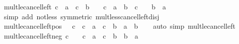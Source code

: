 \begin{isabellebody}
\isanewline
%
\endisadelimproof
\isanewline
{}\isamarkupfalse%
\ mult{\isacharunderscore}{\kern0pt}le{\isacharunderscore}{\kern0pt}cancel{\isacharunderscore}{\kern0pt}left{\isacharcolon}{\kern0pt}\ {\isachardoublequoteopen}c\ {\isacharasterisk}{\kern0pt}\ a\ {\isasymle}\ c\ {\isacharasterisk}{\kern0pt}\ b\ {\isasymlongleftrightarrow}\ {\isacharparenleft}{\kern0pt}{}\ {\isacharless}{\kern0pt}\ c\ {\isasymlongrightarrow}\ a\ {\isasymle}\ b{\isacharparenright}{\kern0pt}\ {\isasymand}\ {\isacharparenleft}{\kern0pt}c\ {\isacharless}{\kern0pt}\ {}\ {\isasymlongrightarrow}\ b\ {\isasymle}\ a{\isacharparenright}{\kern0pt}{\isachardoublequoteclose}\isanewline
%
\isadelimproof
\ \ %
\endisadelimproof
%
\isatagproof
{}\isamarkupfalse%
\ {\isacharparenleft}{\kern0pt}simp\ add{\isacharcolon}{\kern0pt}\ not{\isacharunderscore}{\kern0pt}less\ {\isacharbrackleft}{\kern0pt}symmetric{\isacharbrackright}{\kern0pt}\ mult{\isacharunderscore}{\kern0pt}less{\isacharunderscore}{\kern0pt}cancel{\isacharunderscore}{\kern0pt}left{\isacharunderscore}{\kern0pt}disj{\isacharparenright}{\kern0pt}%
\endisatagproof
{\isafoldproof}%
%
\isadelimproof
\isanewline
%
\endisadelimproof
\isanewline
{}\isamarkupfalse%
\ mult{\isacharunderscore}{\kern0pt}le{\isacharunderscore}{\kern0pt}cancel{\isacharunderscore}{\kern0pt}left{\isacharunderscore}{\kern0pt}pos{\isacharcolon}{\kern0pt}\ {\isachardoublequoteopen}{}\ {\isacharless}{\kern0pt}\ c\ {\isasymLongrightarrow}\ c\ {\isacharasterisk}{\kern0pt}\ a\ {\isasymle}\ c\ {\isacharasterisk}{\kern0pt}\ b\ {\isasymlongleftrightarrow}\ a\ {\isasymle}\ b{\isachardoublequoteclose}\isanewline
%
\isadelimproof
\ \ %
\endisadelimproof
%
\isatagproof
{}\isamarkupfalse%
\ {\isacharparenleft}{\kern0pt}auto\ simp{\isacharcolon}{\kern0pt}\ mult{\isacharunderscore}{\kern0pt}le{\isacharunderscore}{\kern0pt}cancel{\isacharunderscore}{\kern0pt}left{\isacharparenright}{\kern0pt}%
\endisatagproof
{\isafoldproof}%
%
\isadelimproof
\isanewline
%
\endisadelimproof
\isanewline
{}\isamarkupfalse%
\ mult{\isacharunderscore}{\kern0pt}le{\isacharunderscore}{\kern0pt}cancel{\isacharunderscore}{\kern0pt}left{\isacharunderscore}{\kern0pt}neg{\isacharcolon}{\kern0pt}\ {\isachardoublequoteopen}c\ {\isacharless}{\kern0pt}\ {}\ {\isasymLongrightarrow}\ c\ {\isacharasterisk}{\kern0pt}\ a\ {\isasymle}\ c\ {\isacharasterisk}{\kern0pt}\ b\ {\isasymlongleftrightarrow}\ b\ {\isasymle}\ a{\isachardoublequoteclose}\isanewline
%
\isadelimproof
\ \ %
\endisadelimproof
%
\isatagproof

\end{isabellebody}
